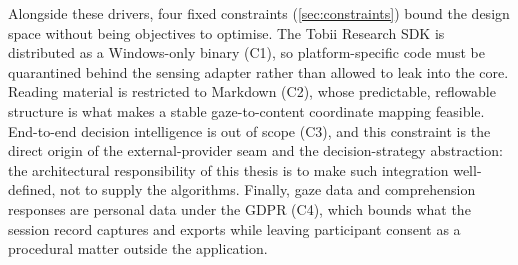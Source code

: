 Alongside these drivers, four fixed constraints (\cref{sec:constraints}) bound the design space without being objectives to optimise.
The Tobii Research SDK is distributed as a Windows-only binary (C1), so platform-specific code must be quarantined behind the sensing adapter rather than allowed to leak into the core.
Reading material is restricted to Markdown (C2), whose predictable, reflowable structure is what makes a stable gaze-to-content coordinate mapping feasible.
End-to-end decision intelligence is out of scope (C3), and this constraint is the direct origin of the external-provider seam and the decision-strategy abstraction: the architectural responsibility of this thesis is to make such integration well-defined, not to supply the algorithms.
Finally, gaze data and comprehension responses are personal data under the GDPR (C4), which bounds what the session record captures and exports while leaving participant consent as a procedural matter outside the application.

